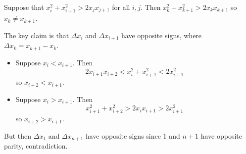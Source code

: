 Suppose that $x_i^2+x_{i+1}^2>2x_jx_{j+1}$ for all $i,j$. Then $x_k^2+x_{k+1}^2>2x_kx_{k+1}$ so $x_k\neq x_{k+1}$.

The key claim is that $\Delta x_i$ and $\Delta x_{i+1}$ have opposite signs, where $\Delta x_k=x_{k+1}-x_k$.
\begin{itemize}
	\item Suppose $x_i<x_{i+1}$. Then \[2x_{i+1}x_{i+2}<x_i^2+x_{i+1}^2<2x_{i+1}^2\] so $x_{i+2}<x_{i+1}$.
	\item Suppose $x_i>x_{i+1}$. Then \[x_{i+1}^2+x_{i+2}^2>2x_ix_{i+1}>2x_{i+1}^2\] so $x_{i+2}>x_{i+1}$.
\end{itemize}
But then $\Delta x_1$ and $\Delta x_{n+1}$ have opposite signs since $1$ and $n+1$ have opposite parity, contradiction.